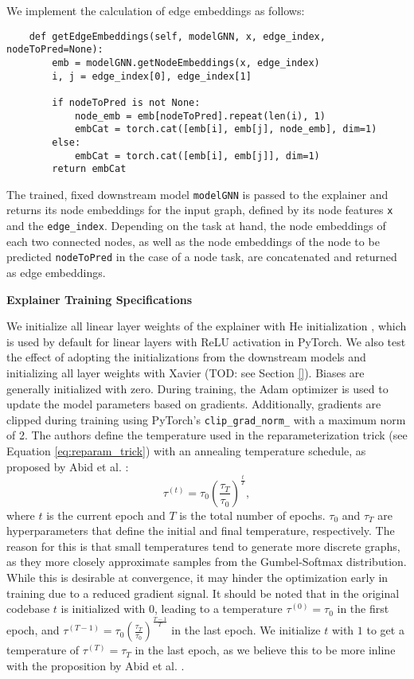We implement the calculation of edge embeddings as follows:
\begin{verbatim}
    def getEdgeEmbeddings(self, modelGNN, x, edge_index, nodeToPred=None):
        emb = modelGNN.getNodeEmbeddings(x, edge_index)
        i, j = edge_index[0], edge_index[1]
        
        if nodeToPred is not None:
            node_emb = emb[nodeToPred].repeat(len(i), 1)
            embCat = torch.cat([emb[i], emb[j], node_emb], dim=1)
        else:
            embCat = torch.cat([emb[i], emb[j]], dim=1)
        return embCat
\end{verbatim}
The trained, fixed downstream model \verb|modelGNN| is passed to the explainer and returns its node embeddings for the input graph, defined by its node features \verb|x| and the \verb|edge_index|. Depending on the task at hand, the node embeddings of each two connected nodes, as well as the node embeddings of the node to be predicted \verb|nodeToPred| in the case of a node task, are concatenated and returned as edge embeddings. \bigskip

\textbf{Explainer Training Specifications}\par
We initialize all linear layer weights of the explainer with He initialization \cite{he2015delving}, which is used by default for linear layers with ReLU activation in PyTorch. We also test the effect of adopting the initializations from the downstream models and initializing all layer weights with Xavier \cite{glorot2010understanding} (TOD: see Section \ref{}). Biases are generally initialized with zero. During training, the Adam optimizer \cite{kingma2014adam} is used to update the model parameters based on gradients. Additionally, gradients are clipped during training using PyTorch's \verb|clip_grad_norm_| with a maximum norm of 2. The authors define the temperature used in the reparameterization trick (see Equation \ref{eq:reparam_trick}) with an annealing temperature schedule, as proposed by Abid et al. \cite{abid2019concrete}:
\begin{equation}
    \tau^{(t)} = \tau_0(\frac{\tau_T}{\tau_0})^{\frac{t}{T}},
\end{equation} 
where $t$ is the current epoch and $T$ is the total number of epochs. $\tau_0$ and $\tau_T$ are hyperparameters that define the initial and final temperature, respectively.
The reason for this is that small temperatures tend to generate more discrete graphs, as they more closely approximate samples from the Gumbel-Softmax distribution. While this is desirable at convergence, it may hinder the optimization early in training due to a reduced gradient signal. It should be noted that in the original codebase $t$ is initialized with $0$, leading to a temperature $\tau^{(0)} = \tau_0$ in the first epoch, and $\tau^{(T-1)} = \tau_0(\frac{\tau_T}{\tau_0})^{\frac{T-1}{T}}$ in the last epoch. We initialize $t$ with $1$ to get a temperature of $\tau^{(T)} = \tau_T$ in the last epoch, as we believe this to be more inline with the proposition by Abid et al. \cite{abid2019concrete}. \bigskip

